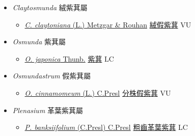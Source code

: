 
  \begin{itemize}
 \item[] \textit{Claytosmunda} 絨紫萁屬
                    
  \begin{itemize}
        \item[] \href{http://www.theplantlist.org/tpl1.1/search?q=Claytosmunda+claytoniana}{\textit{C. claytoniana} (L.) Metzgar \& Rouhan}     \href{\detokenize{http://taibnet.sinica.edu.tw/chi/taibnet_species_list.php?T2=絨假紫萁&T2_new_value=true&fr=y}}{絨假紫萁} VU
  \end{itemize}
 \item[] \textit{Osmunda} 紫萁屬
                    
  \begin{itemize}
        \item[] \href{http://www.theplantlist.org/tpl1.1/search?q=Osmunda+japonica}{\textit{O. japonica} Thunb.}   \href{\detokenize{http://taibnet.sinica.edu.tw/chi/taibnet_species_list.php?T2=紫萁&T2_new_value=true&fr=y}}{紫萁} LC
  \end{itemize}
 \item[] \textit{Osmundastrum} 假紫萁屬
                    
  \begin{itemize}
        \item[] \href{http://www.theplantlist.org/tpl1.1/search?q=Osmundastrum+cinnamomeum}{\textit{O. cinnamomeum} (L.) C.Presl}     \href{\detokenize{http://taibnet.sinica.edu.tw/chi/taibnet_species_list.php?T2=分株假紫萁&T2_new_value=true&fr=y}}{分株假紫萁} VU
  \end{itemize}
 \item[] \textit{Plenasium} 革葉紫萁屬
                    
  \begin{itemize}
        \item[] \href{http://www.theplantlist.org/tpl1.1/search?q=Plenasium+banksiifolium}{\textit{P. banksiifolium} (C.Presl) C.Presl}     \href{\detokenize{http://taibnet.sinica.edu.tw/chi/taibnet_species_list.php?T2=粗齒革葉紫萁&T2_new_value=true&fr=y}}{粗齒革葉紫萁} LC
  \end{itemize}
  \end{itemize}
